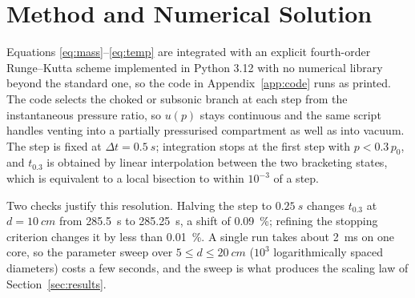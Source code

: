 \section{Method and Numerical Solution}
\label{sec:method}

Equations \eqref{eq:mass}--\eqref{eq:temp} are integrated with an explicit
fourth-order Runge--Kutta scheme \citep{press2007} implemented in Python 3.12 with no
numerical library beyond the standard one, so the code in
Appendix~\ref{app:code} runs as printed. The code selects the choked or subsonic
branch at each step from the instantaneous pressure ratio, so $u(p)$ stays
continuous and the same script handles venting into a partially pressurised
compartment as well as into vacuum. The step is fixed at $\Delta t=\SI{0.5}{s}$; integration stops at the
first step with $p<0.3\,p_0$, and $t_{0.3}$ is obtained by linear
interpolation between the two bracketing states, which is equivalent to a
local bisection to within $10^{-3}$ of a step.

Two checks justify this resolution. Halving the step to
$\SI{0.25}{s}$ changes $t_{0.3}$ at $d=\SI{10}{cm}$ from \SI{285.5}{s} to
\SI{285.25}{s}, a shift of \SI{0.09}{\percent}; refining the stopping
criterion changes it by less than \SI{0.01}{\percent}. A single run takes
about \SI{2}{ms} on one core, so the parameter sweep over
$5\le d\le\SI{20}{cm}$ ($10^{3}$ logarithmically spaced diameters) costs
a few seconds, and the sweep is what produces the scaling law of
Section~\ref{sec:results}.

